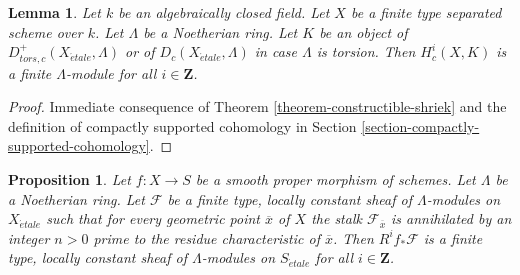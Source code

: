 \documentclass{stacks-project}
\theoremstyle{plain}
\newtheorem{proposition}[subsection]{Proposition}
\newtheorem{lemma}[subsection]{Lemma}
\theoremstyle{definition}
\theoremstyle{remark}
\numberwithin{equation}{subsection}
\def\etale{{\acute{e}tale}}
\begin{document}
\begin{lemma}
\label{lemma-finiteness-compactly-supported}
Let $k$ be an algebraically closed field.
Let $X$ be a finite type separated scheme over $k$.
Let $\Lambda$ be a Noetherian ring. Let $K$ be an object of
$D^+_{tors, c}(X_\etale, \Lambda)$ or of $D_c(X_\etale, \Lambda)$
in case $\Lambda$ is torsion. Then
$H^i_c(X, K)$ is a finite $\Lambda$-module for all
$i \in \mathbf{Z}$.
\end{lemma}

\begin{proof}
Immediate consequence of Theorem \ref{theorem-constructible-shriek}
and the definition of compactly supported cohomology in
Section \ref{section-compactly-supported-cohomology}.
\end{proof}

\begin{proposition}
\label{proposition-loc-cst-torsion}
Let $f : X \to S$ be a smooth proper morphism of schemes.
Let $\Lambda$ be a Noetherian ring. Let $\mathcal{F}$ be a
finite type, locally constant sheaf of $\Lambda$-modules
on $X_\etale$ such that for every geometric point $\overline{x}$ of $X$
the stalk $\mathcal{F}_{\overline{x}}$ is annihilated by an integer
$n > 0$ prime to the residue characteristic of $\overline{x}$.
Then $R^if_*\mathcal{F}$ is a finite type, locally constant sheaf of
$\Lambda$-modules on $S_\etale$ for all $i \in \mathbf{Z}$.
\end{proposition}
\end{document}
